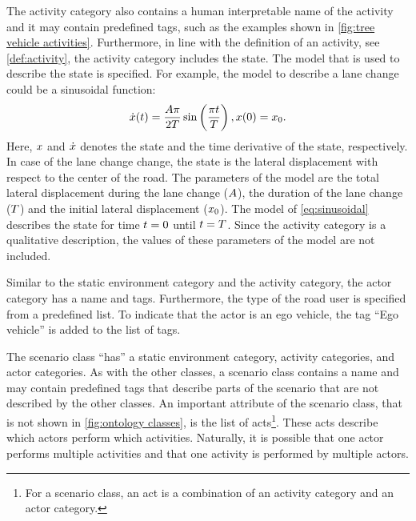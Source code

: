 \cbstart
The activity category also contains a human interpretable name of the activity and it may contain predefined tags, such as the examples shown in \cref{fig:tree vehicle activities}. Furthermore, in line with the definition of an activity, see \cref{def:activity}, the activity category includes the state.  The model that is used to describe the state is specified. For example, the model to describe a lane change could be a sinusoidal function:
\begin{equation} \label{eq:sinusoidal}
	\dot{x}(t) = \frac{A \pi}{2T} \sin \left( \frac{\pi t}{T} \right), x(0) = x_0.
\end{equation}
Here, $x$ and $\dot{x}$ denotes the state and the time derivative of the state, respectively. In case of the lane change change, the state is the lateral displacement with respect to the center of the road. The parameters of the model are the total lateral displacement during the lane change ($A$), the duration of the lane change ($T$) and the initial lateral displacement ($x_0$). The model of \cref{eq:sinusoidal} describes the state for time $t=0$ until $t=T$. Since the activity category is a qualitative description, the values of these parameters of the model are not included.
\cbend

Similar to the static environment category and the activity category, the actor category has a name and tags. Furthermore, the type of the road user is specified from a predefined list. To indicate that the actor is an ego vehicle, the tag ``Ego vehicle'' is added to the list of tags.

The scenario class ``has'' a static environment category, activity categories, and actor categories. As with the other classes, a scenario class contains a name and may contain predefined tags that describe parts of the scenario that are not described by the other classes. An important attribute of the scenario class, that is not shown in \cref{fig:ontology classes}, is the list of acts\cbstart\footnote{\cbstart For a scenario class, an act is a combination of an activity category and an actor category.\cbend}\cbend. These acts describe which actors perform which activities. Naturally, it is possible that one actor performs multiple activities and that one activity is performed by multiple actors.

